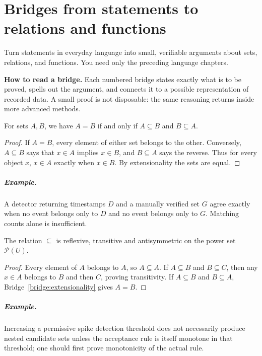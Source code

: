 \chapter{Bridges from statements to relations and functions}
\label{ch:bridges-language}
\begin{readergoal}Turn statements in everyday language into small, verifiable arguments about sets, relations, and functions. You need only the preceding language chapters.\end{readergoal}

\noindent\textbf{How to read a bridge.} Each numbered bridge states exactly what is to be proved, spells out the argument, and connects it to a possible representation of recorded data. A small proof is not disposable: the same reasoning returns inside more advanced methods.

\begin{proposition}For sets $A,B$, we have $A=B$ if and only if $A\subseteq B$ and $B\subseteq A$.\end{proposition}
\begin{proof}If $A=B$, every element of either set belongs to the other. Conversely, $A\subseteq B$ says that $x\in A$ implies $x\in B$, and $B\subseteq A$ says the reverse. Thus for every object $x$, $x\in A$ exactly when $x\in B$. By extensionality the sets are equal.\end{proof}
\paragraph{Example.} A detector returning timestamps $D$ and a manually verified set $G$ agree exactly when no event belongs only to $D$ and no event belongs only to $G$. Matching counts alone is insufficient.

\begin{proposition}The relation $\subseteq$ is reflexive, transitive and antisymmetric on the power set $\mathcal P(U)$.\end{proposition}
\begin{proof}Every element of $A$ belongs to $A$, so $A\subseteq A$. If $A\subseteq B$ and $B\subseteq C$, then any $x\in A$ belongs to $B$ and then $C$, proving transitivity. If $A\subseteq B$ and $B\subseteq A$, Bridge~\ref{bridge:extensionality} gives $A=B$.\end{proof}
\paragraph{Example.} Increasing a permissive spike detection threshold does not necessarily produce nested candidate sets unless the acceptance rule is itself monotone in that threshold; one should first prove monotonicity of the actual rule.

